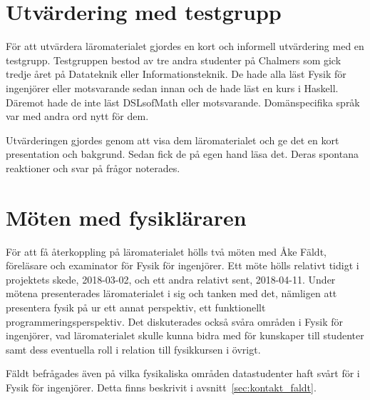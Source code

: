 \begin{draft}

\section{Utvärdering med testgrupp}


För att utvärdera läromaterialet gjordes en kort och informell utvärdering med
en testgrupp. Testgruppen bestod av tre andra studenter på Chalmers som gick
tredje året på Datateknik eller Informationsteknik. De hade alla läst Fysik för
ingenjörer eller motsvarande sedan innan och de hade läst en kurs i Haskell.
Däremot hade de inte läst DSLsofMath eller motsvarande. Domänspecifika språk var
med andra ord nytt för dem.

Utvärderingen gjordes genom att visa dem läromaterialet och ge det en kort
presentation och bakgrund. Sedan fick de på egen hand läsa det. Deras spontana
reaktioner och svar på frågor noterades.

\section{Möten med fysikläraren}

För att få återkoppling på läromaterialet hölls två möten med Åke Fäldt,
föreläsare och examinator för Fysik för ingenjörer. Ett möte hölls relativt
tidigt i projektets skede, 2018-03-02, och ett andra relativt sent, 2018-04-11.
Under mötena presenterades läromaterialet i sig och tanken med det, nämligen att
presentera fysik på ur ett annat perspektiv, ett funktionellt
programmeringsperspektiv. Det diskuterades också svåra områden i Fysik för
ingenjörer, vad läromaterialet skulle kunna bidra med för kunskaper till
studenter samt dess eventuella roll i relation till fysikkursen i övrigt.

Fäldt befrågades även på vilka fysikaliska områden datastudenter haft svårt för
i Fysik för ingenjörer. Detta finns beskrivit i avsnitt~\ref{sec:kontakt_faldt}.

\end{draft}
